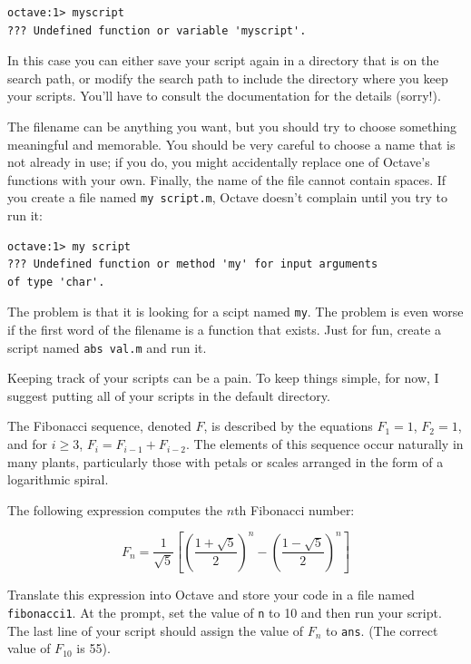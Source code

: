 \documentclass{book}
\begin{document}
\begin{verbatim}
octave:1> myscript
??? Undefined function or variable 'myscript'.
\end{verbatim}

In this case you can either save your script again in a directory
that is on the search path, or modify the search path to include
the directory where you keep your scripts. You'll have to consult
the documentation for the details (sorry!).

The filename can be anything you want, but you should try to choose
something meaningful and memorable. You should be very careful to choose a
name that is not already in use; if you do, you might accidentally
replace one of Octave's functions with your own.
Finally, the name of the file cannot contain spaces. If you create
a file named {\tt my script.m}, Octave doesn't complain until you try
to run it:

\begin{verbatim}
octave:1> my script
??? Undefined function or method 'my' for input arguments 
of type 'char'.
\end{verbatim}

The problem is that it is looking for a scipt named {\tt my}. The
problem is even worse if the first word of the filename is a function
that exists. Just for fun, create a script named {\tt abs val.m}
and run it.

Keeping track of your scripts can be a pain. To keep things simple,
for now, I suggest putting all of your scripts in the default
directory.

\begin{ex}
The Fibonacci sequence, denoted $F$, is described by the equations
$F_1 = 1$, $F_2 = 1$, and for $i \ge 3$, $F_{i} = F_{i-1} + F_{i-2}$.
The elements of this sequence occur naturally in many plants,
particularly those with petals or scales arranged in the form of a
logarithmic spiral.

The following expression computes the
$n$th Fibonacci number:

\begin{equation}
F_n = \frac{1}{\sqrt{5}}
\left[ 
\left( \frac{1 + \sqrt{5}}{2} \right)^{n} -
\left( \frac{1 - \sqrt{5}}{2} \right)^{n}
\right]
\end{equation}

Translate this expression into Octave and store your
code in a file named {\tt fibonacci1}. At the prompt, set the value
of {\tt n} to 10 and then run your script. The last line of your
script should assign the value of $F_n$ to {\tt ans}.
(The correct value of $F_{10}$ is 55).
\end{ex}
\end{document}

